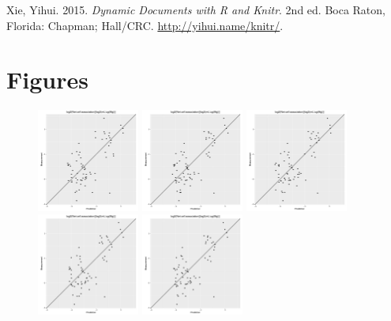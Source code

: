 \documentclass[utf8]{frontiersHLTH} %
\begin{document}
\hypertarget{ref-Xie2015}{}
Xie, Yihui. 2015. \emph{Dynamic Documents with R and Knitr}. 2nd ed.
Boca Raton, Florida: Chapman; Hall/CRC. \url{http://yihui.name/knitr/}.




\newpage

\section{Figures}\label{figures}

\begin{figure}[H]

\includegraphics[width=0.3000\textwidth]{figures/MP2D-rf-0.pdf}\label{fig:fingerprint0}
\includegraphics[width=0.3000\textwidth]{figures/MP2D-rf-1.pdf}\label{fig:fingerprint1}
\includegraphics[width=0.3000\textwidth]{figures/MP2D-rf-2.pdf}\label{fig:fingerprint2}
\includegraphics[width=0.3000\textwidth]{figures/MP2D-rf-3.pdf}\label{fig:fingerprint3}
\includegraphics[width=0.3000\textwidth]{figures/MP2D-rf-4.pdf}\label{fig:fingerprint4}


\end{figure}
\end{document}
